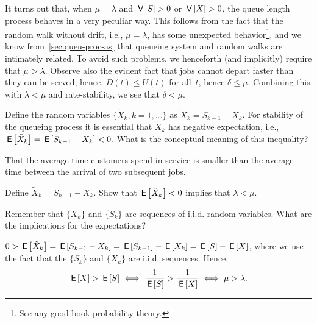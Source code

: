 It turns out that, when $\mu = \lambda$ and $\,\mathsf{V}\left[S\right] > 0$ or $\,\mathsf{V}\left[X\right] >0$, the queue length process behaves in a very peculiar way.
This follows from the fact that the random walk without drift, i.e., $\mu=\lambda$, has some unexpected behavior\footnote{See any good book probability theory.}, and we know from~\cref{sec:queu-proc-as} that queueing system and random walks are intimately related.
To avoid such problems, we henceforth (and implicitly) require that $\mu > \lambda$.
Observe also the evident fact that jobs cannot depart faster than they can be served, hence, $D(t) \leq U(t)$ for all~$t$, hence $\delta \leq \mu$.
Combining this with $\lambda < \mu$ and rate-stability, we see that $\delta < \mu$.


\begin{extra}
  Define the random variables $\{\tilde X_k,k=1,\ldots\}$ as $\tilde X_k = S_{k-1}-X_k$.
  For stability of the queueing process it is essential that $\tilde X_k$ has negative expectation, i.e., $\,\mathsf{E}\left[\tilde X_k\right] = \,\mathsf{E}\left[S_{k-1}-X_k\right] < 0$.
  What is the conceptual meaning of this inequality?
\begin{solution}
 That the average time customers spend in service is smaller
 than the average time between the arrival of two subsequent
 jobs. 
\end{solution}
\end{extra}

\begin{exercise}
Define $\tilde X_k = S_{k-1}-X_k$.
 Show that $\,\mathsf{E}\left[\tilde X_k\right] <0$ implies that $\lambda<\mu$. 
\begin{hint}
Remember that $\{X_k\}$ and $\{S_k\}$ are sequences of i.i.d. random variables. What are the implications for the expectations?
\end{hint}
\begin{solution}
 $0> \,\mathsf{E}\left[\tilde X_k\right] = \,\mathsf{E}\left[S_{k-1}-X_k\right] = \,\mathsf{E}\left[ S_{k-1}\right]- \,\mathsf{E}\left[X_k\right] = \,\mathsf{E}\left[S\right] - \,\mathsf{E}\left[X\right]$, where we use the fact that the $\{S_k\}$ and $\{X_k\}$ are i.i.d. sequences. Hence, 
 \begin{equation*}
 \,\mathsf{E}\left[X\right] > \,\mathsf{E}\left[S\right] \iff \frac 1{\,\mathsf{E}\left[S\right]} > \frac1{\,\mathsf{E}\left[X\right]} \iff \mu > \lambda.
 \end{equation*}

\end{solution}
\end{exercise}

